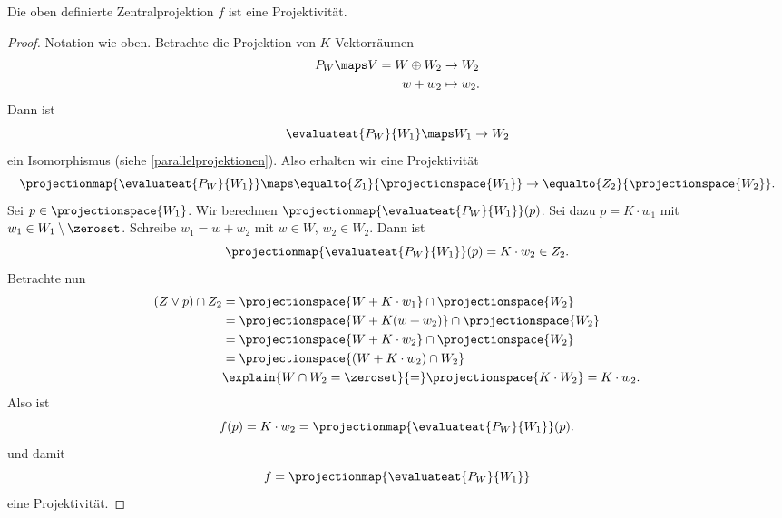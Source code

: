 \begin{lemma}
  Die oben definierte Zentralprojektion \( f \) ist eine Projektivität.
\end{lemma}
\begin{proof}
  Notation wie oben. Betrachte die Projektion von \( K \)-Vektorräumen
  \begin{equation*}
    \begin{split}
      P_W\maps V=W\oplus W_2&\to W_2\\
      w+w_2&\mapsto w_2.
    \end{split}
  \end{equation*}
  Dann ist
  \begin{equation*}
    \evaluateat{P_W}{W_1}\maps W_1\to W_2
  \end{equation*}
  ein Isomorphismus (siehe \ref{parallelprojektionen}). Also erhalten wir eine Projektivität
  \begin{equation*}
    \projectionmap{\evaluateat{P_W}{W_1}}\maps \equalto{Z_1}{\projectionspace{W_1}}\to \equalto{Z_2}{\projectionspace{W_2}}.
  \end{equation*}
  Sei \( p\in \projectionspace{W_1} \). Wir berechnen \( \projectionmap{\evaluateat{P_W}{W_1}}(p) \). Sei dazu \( p=K\cdot w_1 \) mit \( w_1\in W_1\setminus \zeroset \). Schreibe \( w_1=w+w_2 \) mit \( w\in W \), \( w_2\in W_2 \). Dann ist 
  \begin{equation*}
    \projectionmap{\evaluateat{P_W}{W_1}}(p)=K\cdot w_2\in Z_2.
  \end{equation*}
  Betrachte nun
  \begin{align*}
    (Z\vee p)\cap Z_2&=\projectionspace{W+K\cdot w_1}\cap \projectionspace{W_2}\\
    &=\projectionspace{W+K(w+w_2)}\cap \projectionspace{W_2}\\
    &=\projectionspace{W+K\cdot w_2}\cap \projectionspace{W_2}\\
    &=\projectionspace{(W+K\cdot w_2)\cap W_2}\\
    &\explain{W\cap W_2=\zeroset}{=}\projectionspace{K\cdot W_2}=K\cdot w_2.
  \end{align*}
  Also ist
  \begin{equation*}
    f(p)=K\cdot w_2=\projectionmap{\evaluateat{P_W}{W_1}}(p).
  \end{equation*}
  und damit
  \begin{equation*}
    f=\projectionmap{\evaluateat{P_W}{W_1}}
  \end{equation*}
  eine Projektivität.
\end{proof}